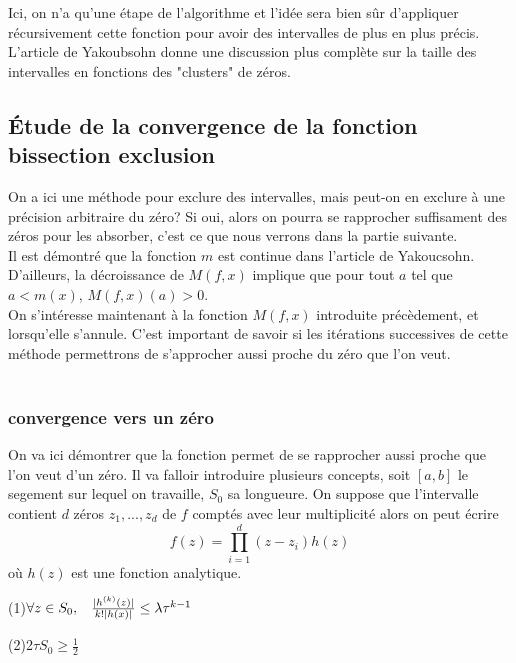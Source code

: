 \documentclass[a4paper,10.5pt]{article}
\begin{document}
	\noindent Ici, on n'a qu'une étape de l'algorithme et l'idée sera bien sûr d'appliquer récursivement cette fonction pour avoir des intervalles de plus en plus précis. L'article de Yakoubsohn donne une discussion plus complète sur la taille des intervalles en fonctions des "clusters" de zéros.\\

	\subsection{Étude de la convergence de la fonction bissection exclusion}
	On a ici une méthode pour exclure des intervalles, mais peut-on en exclure à une précision arbitraire du zéro? Si oui, alors on pourra se rapprocher suffisament des zéros pour les absorber, c'est ce que nous verrons dans la partie suivante.\\
	Il est démontré que la fonction $m$ est continue dans l'article de Yakoucsohn. 
	D'ailleurs, la décroissance de $M(f,x)$ implique que pour tout $a$ tel que $a<m(x)$, $M(f,x)(a)>0$.\\
	On s'intéresse maintenant à la fonction $M(f,x)$ introduite précèdement, et lorsqu'elle s'annule. C'est important de savoir si les itérations successives de cette méthode permettrons de s'approcher aussi proche du zéro que l'on veut.\\
	\\
	\subsubsection{convergence vers un zéro}
	On va ici démontrer que la fonction permet de se rapprocher aussi proche que l'on veut d'un zéro.
	Il va falloir introduire plusieurs concepts, soit $[a,b]$  le segement sur lequel on travaille, $S_0$ sa longueure.
	On suppose que l'intervalle contient $d$ zéros $z_1,...,z_d$ de $f$ comptés avec leur multiplicité alors on peut écrire
	\[f(z)=\prod_{i=1}^{d}(z-z_i)h(z)\]
	où $h(z)$ est une fonction analytique.
		
		(1)$\forall z \in S_0, \hspace{3mm} \frac{|h^{(k)}(z)|}{k!|h(x)|}\leq \lambda \tau^{k-1}$
		
		(2)2$\tau S_0 \geq \frac{1}{2}$
		
\end{document}
